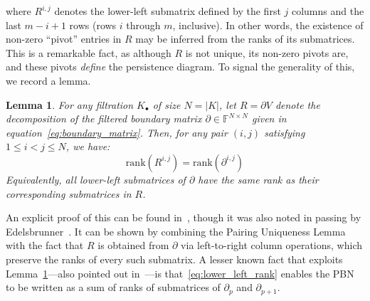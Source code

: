 \documentclass[12pt]{article}
\numberwithin{equation}{section}
\newcommand{\+}{%
	\raisebox{0.18ex}{\scaleobj{0.55}{+}}
}
\newtheorem{lemma}{Lemma}
\theoremstyle{definition}
\begin{document}
where $R^{i, j}$ denotes the lower-left submatrix defined by the first $j$ columns and the last $m - i + 1$ rows (rows $i$ through $m$, inclusive). 
In other words, the existence of non-zero ``pivot'' entries in $R$ may be inferred from the ranks of its submatrices.   
This is a remarkable fact, as although $R$ is not unique, its non-zero pivots are, and these pivots \emph{define} the persistence diagram. 
To signal the generality of this, we record a lemma. 
\begin{lemma}\label{lemma:rank}
For any filtration $K_\bullet$ of size $N = \lvert K \rvert$, let $R = \partial V$ denote the decomposition of the filtered boundary matrix $\partial \in \mathbb{F}^{N \times N}$ given in equation~\ref{eq:boundary_matrix}. Then, for any pair $(i,j)$ satisfying $1 \leq i < j \leq N$, we have:
	\begin{equation}\label{eq:lower_left_rank}
		\mathrm{rank}(R^{i,j}) = \mathrm{rank}(\partial^{i, j})
	\end{equation}
Equivalently, all lower-left submatrices of $\partial$ have the same rank as their corresponding submatrices in $R$.
\end{lemma} %
\noindent
An explicit proof of this can be found in~\cite{dey2022computational}, though it was also noted in passing by Edelsbrunner~\cite{edelsbrunner2000topological}. It can be shown by combining the Pairing Uniqueness Lemma with the fact that $R$ is obtained from $\partial$ via left-to-right column operations, which preserve the ranks of every such submatrix.
A lesser known fact that exploits Lemma~\ref{lemma:rank}---also pointed out in~\cite{dey2022computational}---is that~\eqref{eq:lower_left_rank} enables the PBN to be written as a sum of ranks of submatrices of $\partial_p$ and $\partial_{p+1}$.
\end{document}
